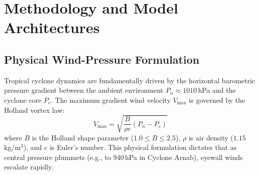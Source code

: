 \documentclass[conference]{IEEEtran}
\begin{document}
\section{Methodology and Model Architectures}

\subsection{Physical Wind-Pressure Formulation}
Tropical cyclone dynamics are fundamentally driven by the horizontal barometric pressure gradient between the ambient environment $P_n \approx 1010$\,hPa and the cyclone core $P_c$. The maximum gradient wind velocity $V_{\text{max}}$ is governed by the Holland vortex law:
\begin{equation}
    V_{\text{max}} = \sqrt{\frac{B}{\rho e} (P_n - P_c)}
    \label{eq:holland}
\end{equation}
where $B$ is the Holland shape parameter ($1.0 \le B \le 2.5$), $\rho$ is air density ($1.15$\,kg/m$^3$), and $e$ is Euler's number. This physical formulation dictates that as central pressure plummets (e.g., to 940\,hPa in Cyclone Arnab), eyewall winds escalate rapidly.
\end{document}

